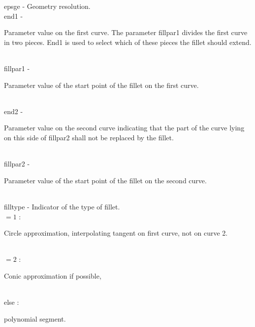         \>\>    {\fov epsge}    \> - \> Geometry resolution.\\
        \>\>    {\fov end1}     \> - \> \begin{minipg2}
                        Parameter value on the first curve. The parameter fillpar1 divides the first curve in two pieces. End1 is used to select which of these pieces the fillet should extend.
                                \end{minipg2}\\[0.8ex]
        \>\>    {\fov fillpar1}\> - \>  \begin{minipg2}
                        Parameter value of the start point of the fillet
                                on the first curve.
                                \end{minipg2}\\[0.8ex]
        \>\>    {\fov end2}     \> - \> \begin{minipg2}
                        Parameter value on the second curve indicating that
                        the part of the curve lying on this side of fillpar2
                                shall not be replaced by the fillet.
                                \end{minipg2}\\[0.3ex]
        \>\>    {\fov fillpar2}\> - \>  \begin{minipg2}
                        Parameter value of the start point of the fillet
                                on the second curve.
                                \end{minipg2}\\
\newpagetabs
        \>\>    {\fov filltype}\> - \>  Indicator of the type of fillet.\\
                \>\>\>\>\>      $=1$ : \>\begin{minipg5}
                                Circle approximation, interpolating tangent on first
                                curve, not on curve 2.
                                \end{minipg5}\\[0.3ex]
                \>\>\>\>\>      $=2$ : \>\begin{minipg5}
                                Conic approximation if possible,
                                \end{minipg5}\\
                \>\>\>\>\>      else : \>\begin{minipg5}
                                polynomial segment.
                                \end{minipg5}\\
